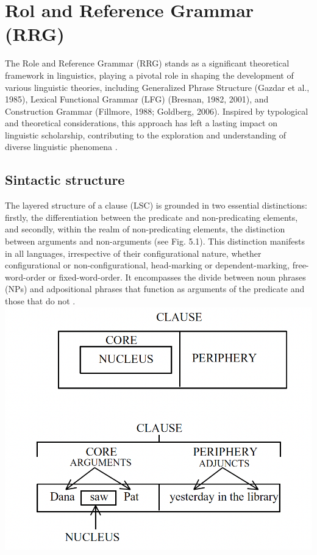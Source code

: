 \chapter{Rol and Reference Grammar (RRG)}


The Role and Reference Grammar (RRG) stands as a significant theoretical framework in linguistics, playing a pivotal role in shaping the development of various linguistic theories, including Generalized Phrase Structure (Gazdar et al., 1985), Lexical Functional Grammar (LFG) (Bresnan, 1982, 2001), and Construction Grammar (Fillmore, 1988; Goldberg, 2006). Inspired by typological and theoretical considerations, this approach has left a lasting impact on linguistic scholarship, contributing to the exploration and understanding of diverse linguistic phenomena \parencite{van2009overview}.

\section{Sintactic structure}

The layered structure of a clause (LSC) is grounded in two essential distinctions: firstly, the differentiation between the predicate and non-predicating elements, and secondly, within the realm of non-predicating elements, the distinction between arguments and non-arguments (see Fig. 5.1). This distinction manifests in all languages, irrespective of their configurational nature, whether configurational or non-configurational, head-marking or dependent-marking, free-word-order or fixed-word-order. It encompasses the divide between noun phrases (NPs) and adpositional phrases that function as arguments of the predicate and those that do not \parencite{van1997syntax}. \\


\includegraphics[width=\textwidth]{figures/clausestructure.png}


